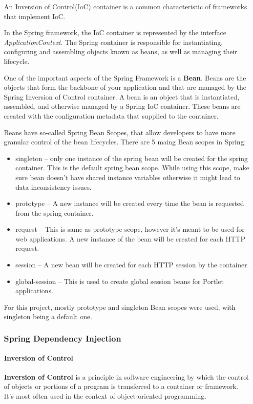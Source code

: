\documentclass[thesis=M,english,hidelinks]{FITthesis}[2019/12/23]
\begin{document}
An Inversion of Control(IoC) container is a common characteristic of frameworks that implement IoC.

In the Spring framework, the IoC container is represented by the interface \textit{ApplicationContext}. The Spring container is responsible for instantiating, configuring and assembling objects known as beans, as well as managing their lifecycle.

One of the important aspects of the Spring Framework is a \textbf{Bean}. Beans are the objects that form the backbone of your application and that are managed by the Spring Inversion of Control container. A bean is an object that is instantiated, assembled, and otherwise managed by a Spring IoC container. These beans are created with the configuration metadata that supplied to the container.

Beans have so-called Spring Bean Scopes, that allow developers to have more granular control of the bean lifecycles. There are 5 maing Bean scopes in Spring:

\begin{itemize}
	\item singleton – only one instance of the spring bean will be created for the spring container. This is the default spring bean scope. While using this scope, make sure bean doesn’t have shared instance variables otherwise it might lead to data inconsistency issues.
	\item prototype – A new instance will be created every time the bean is requested from the spring container.
	\item request – This is same as prototype scope, however it’s meant to be used for web applications. A new instance of the bean will be created for each HTTP request.
	\item session – A new bean will be created for each HTTP session by the container.
	\item global-session – This is used to create global session beans for Portlet applications.
\end{itemize}

For this project, mostly prototype and singleton Bean scopes were used, with singleton being a default one.

\subsubsection{Spring Dependency Injection}\label{spring}

\paragraph{Inversion of Control}
\textbf{Inversion of Control} is a principle in software engineering by which the control of objects or portions of a program is transferred to a container or framework. It's most often used in the context of object-oriented programming.
\end{document}
